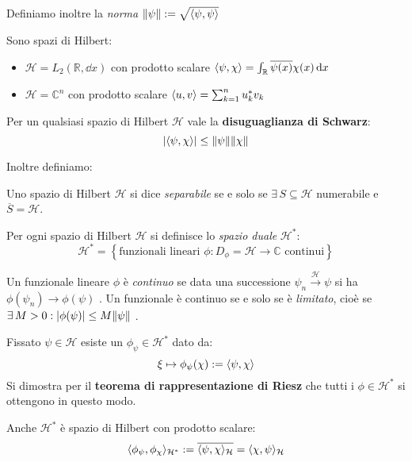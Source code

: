 Definiamo inoltre la \textit{norma} \(\norm{\psi}: = \sqrt{\langle \psi, \psi \rangle }\)

\begin{example}
    Sono spazi di Hilbert:
    \begin{itemize}
        \item \(\mathcal{H}= L_2(\mathbb{R},\dd{x})\) con prodotto scalare \(\langle \psi, \chi \rangle= \int_{\mathbb{R}} \overline{\psi(x)}\chi(x)\dd{x}\)
        \item \(\mathcal{H}= \mathbb{C}^n\) con prodotto scalare \(\langle u, v \rangle= \sum_{k=1}^{n} u_k^* v_k\)
    \end{itemize}
\end{example}

Per un qualsiasi spazio di Hilbert \(\mathcal{H}\) vale la \textbf{disuguaglianza di Schwarz}:
\begin{equation}
    \abs{\langle \psi, \chi \rangle}\leq \norm{\psi}\norm{\chi}
\end{equation}

Inoltre definiamo:
\begin{definition}
    Uno spazio di Hilbert \(\mathcal{H}\) si dice \textit{separabile} se e solo se \(\exists \, S \subseteq \mathcal{H}\) numerabile e \(\overline{S}= \mathcal{H}\).
\end{definition}
\begin{definition}
    Per ogni spazio di Hilbert \(\mathcal{H}\) si definisce lo \textit{spazio duale} \(\mathcal{H}^* \):
    \[
    \mathcal{H}^*= \left\{ \text{funzionali lineari }\phi: D_\phi = \mathcal{H}\to \mathbb{C} \text{ continui}\right\}
    \]
\end{definition}
\begin{definition}
    Un funzionale lineare \(\phi\) è \textit{continuo} se data una successione \(\psi_n \overset{\mathcal{H}}{\to} \psi\) si ha \(\phi(\psi_n)\to \phi(\psi)\) .
    Un funzionale è continuo se e solo se è \textit{limitato}, cioè se \(\exists\, M> 0 : \abs{\phi(\psi)} \leq M \norm{\psi}\) .
\end{definition}


\begin{example}
    Fissato \(\psi\in \mathcal{H}\) esiste un \(\phi_\psi \in \mathcal{H}^*\) dato da:
    \begin{equation}
        \xi\mapsto \phi_\psi(\chi):= \langle \psi, \chi \rangle
    \end{equation}
    Si dimostra per il \textbf{teorema di rappresentazione di Riesz} che tutti i \(\phi \in \mathcal{H}^*\) si ottengono in questo modo.

    \begin{remark}
        Anche \(\mathcal{H}^*\) è spazio di Hilbert con prodotto scalare:
        \[
        \langle \phi_\psi, \phi_\chi \rangle_{\mathcal{H}^*}:= \overline{\langle \psi, \chi \rangle_\mathcal{H}}= \langle \chi, \psi \rangle_\mathcal{H}
        \]
    \end{remark}
\end{example}



